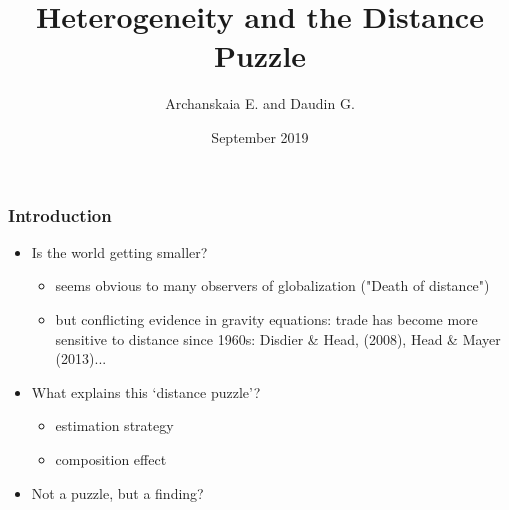 \documentclass{beamer}
\newcommand{\noteLA}[1]{\textcolor{blue}{\footnotesize\textit{{noteLA: #1}}}} %
\def\noteLA #1{} %
\begin{document}
\title{Heterogeneity and the Distance Puzzle}  
\author[Archanskaia and Daudin]{Archanskaia E.\inst{*} and Daudin G.\inst{**}}
\date{September 2019
\\
\vspace{.3cm}
} 
\begin{frame}[plain]
\titlepage
\end{frame}

\begin{frame}[plain]\frametitle{Introduction}
\begin{itemize}
\vspace{0.3cm}
\item Is the world getting smaller?
\vspace{0.2cm}
\begin{itemize}
\item seems obvious to many observers of globalization ("Death of distance")
\item but conflicting evidence in gravity equations: trade has become more sensitive to distance since 1960s: Disdier  \&  Head, (2008), Head \& Mayer (2013)...
\end{itemize}
\vspace{0.3cm}
\item What explains this `distance puzzle'?
\vspace{0.2cm}
\begin{itemize}
\item estimation strategy 
\item composition effect \\
\noteLA{Contribute to but do not remove it}
\end{itemize}
\vspace{0.3cm}
\noteLA{Say here: world may be getting smaller while at the same time the elasticity of trade to distance may be non-decreasing. This is where ambiguity in distance puzzle appears.}
\item Not a puzzle, but a finding?
\vspace{0.2cm}
\begin{itemize}

\end{itemize}
\end{itemize}
\end{frame}
\end{document}

